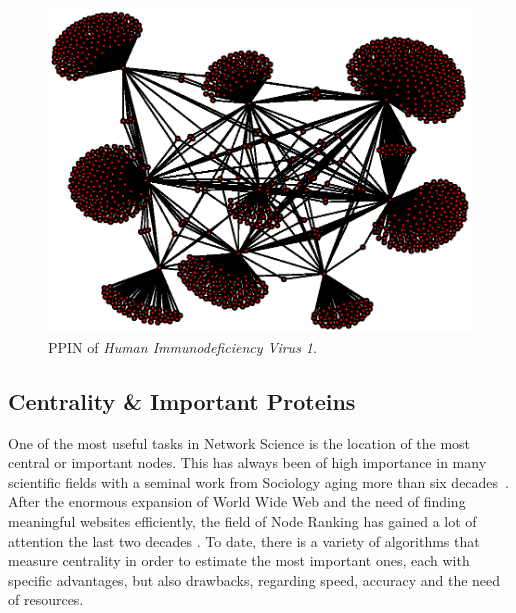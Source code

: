 \begin{figure}
  \centering
  \vspace{-70pt}
  \includegraphics[width=.99\linewidth]{Graphics/Human_Immunodeficiency_Virus_1graph.eps}
  \vspace{-30pt}
  \caption{PPIN of \textit{Human Immunodeficiency Virus 1}.}
  \label{fig:HIV}
\end{figure}

\subsection{Centrality \& Important Proteins}
One of the most useful tasks in Network Science is the location of the most central or important nodes. This has always been of high importance in many scientific fields with a seminal work from Sociology aging more than six decades~\cite{katz1953new}. After the enormous expansion of World Wide Web and the need of finding meaningful websites efficiently, the field of Node Ranking has gained a lot of attention the last two decades \cite{langville2011google}. To date, there is a variety of algorithms that measure centrality in order to estimate the most important ones, each with specific advantages, but also drawbacks, regarding speed, accuracy and the need of resources.   

